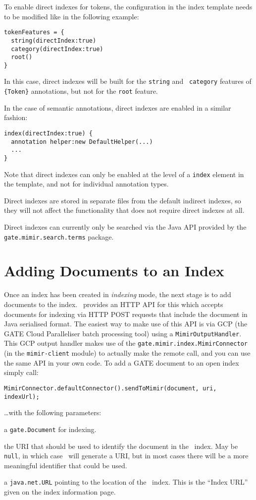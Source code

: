 To enable direct indexes for tokens, the configuration in the index template
needs to be modified like in the following example:
\begin{lstlisting}
tokenFeatures = {
  string(directIndex:true)
  category(directIndex:true)
  root()
}
\end{lstlisting}

In this case, direct indexes will be built for the {\tt string} and {\tt
category} features of \verb!{Token}! annotations, but not for the {\tt root}
feature.

In the case of semantic annotations, direct indexes are enabled in a similar
fashion:
\begin{lstlisting}
index(directIndex:true) {
  annotation helper:new DefaultHelper(...)
  ...
}
\end{lstlisting}

Note that direct indexes can only be enabled at the level of a {\tt index}
element in the template, and not for individual annotation types.

Direct indexes are stored in separate files from the default indirect indexes,
so they will not affect the functionality that does not require direct indexes
at all.

Direct indexes can currently only be searched via the Java API provided by the
{\tt gate.mimir.search.terms} package.

\section{Adding Documents to an Index}\label{sec:indexing:add-docs}

Once an index has been created in {\em indexing} mode, the next stage is to add
documents to the index.  \Mimir\ provides an HTTP API for this which accepts
documents for indexing via HTTP POST requests that include the document in Java
serialised format.  The easiest way to make use of this API is via GCP (the
GATE Cloud Paralleliser batch processing tool) using a
\lstinline!MimirOutputHandler!.  This GCP output handler makes use of the
\lstinline!gate.mimir.index.MimirConnector! (in the {\tt mimir-client} module)
to actually make the remote call, and you can use the same API in your own
code.  To add a GATE document to an open index simply call:
\begin{lstlisting}[breaklines]
MimirConnector.defaultConnector().sendToMimir(document, uri, indexUrl);
\end{lstlisting}
%
\ldots{}with the following parameters:
\bde
\item[document] a \lstinline!gate.Document! for indexing.
\item[uri] the URI that should be used to identify the document in the \Mimir\
  index.  May be \lstinline!null!, in which case \Mimir\ will generate a URI,
  but in most cases there will be a more meaningful identifier that could be
  used.
\item[indexUrl] a \lstinline!java.net.URL! pointing to the location of the
  \Mimir\ index.  This is the ``Index URL'' given on the index information page.
\ede

